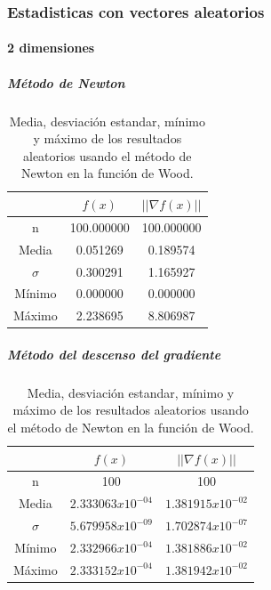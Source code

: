 \subsubsection{Estadisticas con vectores aleatorios}

\paragraph{2 dimensiones}

\subparagraph{Método de Newton}

\begin{table}[H]
    \centering
    \begin{tabular}{ccc} \hline
                 & $f(x)$     & $||\nabla f(x)||$ \\ \hline
        n        & 100.000000 & 100.000000        \\
        Media    & 0.051269   & 0.189574          \\
        $\sigma$ & 0.300291   & 1.165927          \\
        Mínimo   & 0.000000   & 0.000000          \\
        Máximo   & 2.238695   & 8.806987          \\ \hline
    \end{tabular}
    \caption{Media, desviación estandar, mínimo y máximo de los resultados aleatorios usando el método de Newton en la función de Wood.}
    \label{table:rosembrock_4_random_newton}
\end{table}

\subparagraph{Método del descenso del gradiente}

\begin{table}[H]
    \centering
    \begin{tabular}{ccc} \hline
        {}       & $f(x)$              & $||\nabla f(x)||$   \\ \hline
        n        & 100                 & 100                 \\
        Media    & $2.333063x10^{-04}$ & $1.381915x10^{-02}$ \\
        $\sigma$ & $5.679958x10^{-09}$ & $1.702874x10^{-07}$ \\
        Mínimo   & $2.332966x10^{-04}$ & $1.381886x10^{-02}$ \\
        Máximo   & $2.333152x10^{-04}$ & $1.381942x10^{-02}$ \\ \hline
    \end{tabular}
    \caption{Media, desviación estandar, mínimo y máximo de los resultados aleatorios usando el método de Newton en la función de Wood.}
    \label{table:rosembrock_4_random_gradient}
\end{table}

